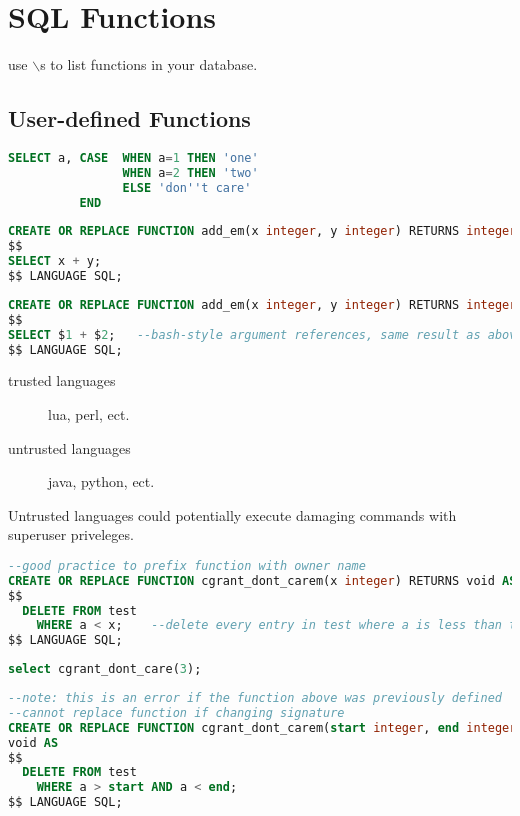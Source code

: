 \documentclass[12pt]{article}
\begin{document}
\section{SQL Functions}
use $\backslash$s to list functions in your database.
\subsection{User-defined Functions}
\begin{lstlisting}[language=sql]
SELECT a, CASE  WHEN a=1 THEN 'one'
                WHEN a=2 THEN 'two'
                ELSE 'don''t care'
          END
\end{lstlisting}


\begin{lstlisting}[language=sql, caption=example function]
CREATE OR REPLACE FUNCTION add_em(x integer, y integer) RETURNS integer AS
$$
SELECT x + y;
$$ LANGUAGE SQL;
\end{lstlisting}

\begin{lstlisting}[language=sql, caption=alternate argument reference style]
CREATE OR REPLACE FUNCTION add_em(x integer, y integer) RETURNS integer AS
$$
SELECT $1 + $2;   --bash-style argument references, same result as above
$$ LANGUAGE SQL;
\end{lstlisting}

\begin{description}
  \item[trusted languages] lua, perl, ect.
  \item[untrusted languages] java, python, ect.
\end{description}
Untrusted languages could potentially execute damaging commands with superuser
priveleges.

\begin{lstlisting}[language=sql, caption=another function]
--good practice to prefix function with owner name
CREATE OR REPLACE FUNCTION cgrant_dont_carem(x integer) RETURNS void AS
$$
  DELETE FROM test
    WHERE a < x;    --delete every entry in test where a is less than the arg
$$ LANGUAGE SQL;
\end{lstlisting}

\begin{lstlisting}[language=sql, caption=calling a function]
  select cgrant_dont_care(3);
\end{lstlisting}

\begin{lstlisting}[language=sql, caption=function with a range]
--note: this is an error if the function above was previously defined
--cannot replace function if changing signature
CREATE OR REPLACE FUNCTION cgrant_dont_carem(start integer, end integer) RETURNS
void AS
$$
  DELETE FROM test
    WHERE a > start AND a < end;
$$ LANGUAGE SQL;
\end{lstlisting}
\end{document}
